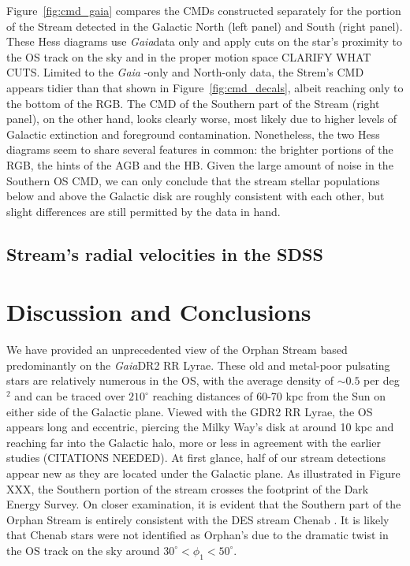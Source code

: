\documentclass[a4paper,useAMS,usenatbib]{mnras}
\newcommand{\Gaia}{{\it Gaia}}
\newcommand{\gaia}{\textit{Gaia} }
\begin{document}
Figure~\ref{fig:cmd_gaia} compares the CMDs constructed separately for
the portion of the Stream detected in the Galactic North (left panel)
and South (right panel). These Hess diagrams use \Gaia data only and
apply cuts on the star's proximity to the OS track on the sky and in
the proper motion space CLARIFY WHAT CUTS. Limited to the \gaia-only
and North-only data, the Strem's CMD appears tidier than that shown in
Figure~\ref{fig:cmd_decals}, albeit reaching only to the bottom of the
RGB. The CMD of the Southern part of the Stream (right panel), on the
other hand, looks clearly worse, most likely due to higher levels of
Galactic extinction and foreground contamination. Nonetheless, the two
Hess diagrams seem to share several features in common: the brighter
portions of the RGB, the hints of the AGB and the HB. Given the large
amount of noise in the Southern OS CMD, we can only conclude that the
stream stellar populations below and above the Galactic disk are
roughly consistent with each other, but slight differences are still
permitted by the data in hand.

\subsection{Stream's radial velocities in the SDSS}

\section{Discussion and Conclusions}
\label{sec:conc}

We have provided an unprecedented view of the Orphan Stream based
predominantly on the \Gaia DR2 RR Lyrae. These old and metal-poor
pulsating stars are relatively numerous in the OS, with the average
density of $\sim0.5$ per deg$^2$ and can be traced over $210^{\circ}$
reaching distances of 60-70 kpc from the Sun on either side of the
Galactic plane. Viewed with the GDR2 RR Lyrae, the OS appears long and
eccentric, piercing the Milky Way's disk at around 10 kpc and reaching
far into the Galactic halo, more or less in agreement with the earlier
studies (CITATIONS NEEDED). At first glance, half of our stream
detections appear new as they are located under the Galactic plane. As
illustrated in Figure XXX, the Southern portion of the stream crosses
the footprint of the Dark Energy Survey. On closer examination, it is
evident that the Southern part of the Orphan Stream is entirely
consistent with the DES stream Chenab \citep[see][]{Shipp2018}. It is
likely that Chenab stars were not identified as Orphan's due to the
dramatic twist in the OS track on the sky around
$30^{\circ}<\phi_1<50^{\circ}$.
\end{document}

